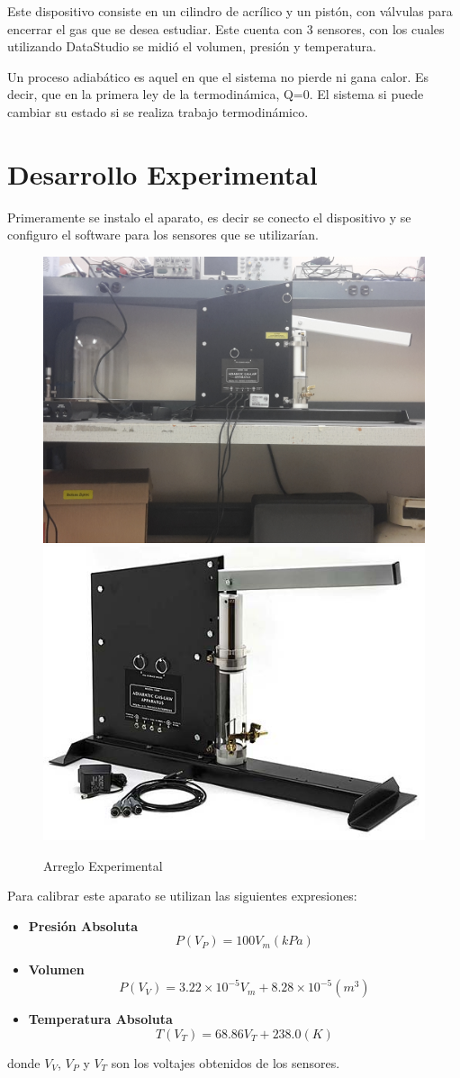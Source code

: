 \documentclass[12pt]{article}
\begin{document}
\hspace{0.75cm}	Este dispositivo consiste en un cilindro de acrílico y un pistón, con válvulas para encerrar el gas que se desea estudiar. Este cuenta con 3 sensores, con los cuales utilizando DataStudio se midió el volumen, presión y temperatura.

\hspace{0.75cm} Un proceso adiabático es aquel en que el sistema no pierde ni gana calor. Es decir, que en la primera ley de la termodinámica, Q=0. El sistema si puede cambiar su estado si se realiza trabajo termodinámico.

\section{Desarrollo Experimental}
Primeramente se instalo el aparato, es decir se conecto el dispositivo y se configuro el software para los sensores que se utilizarían.
\begin{figure}[H]\label{config}
\centering
\includegraphics[width=0.45\linewidth]{config.jpg}
\includegraphics[width=0.45\linewidth]{aparato.jpg}
\caption{Arreglo Experimental}
\end{figure}
\pagebreak
Para calibrar este aparato se utilizan las siguientes expresiones:
\begin{itemize}
	\item \textbf{Presión Absoluta}$$P(V_P) = 100 V_m (kPa)$$
	\item \textbf{Volumen} $$ P(V_V) = 3.22\times 10^{-5}V_m + 8.28\times 10^{-5} (m^3) $$
	\item \textbf{Temperatura Absoluta} $$ T(V_T) = 68.86V_T +238.0 (K) $$
\end{itemize}
donde $V_V$, $V_P$ y $V_T$ son los voltajes obtenidos de los sensores.
\end{document}
